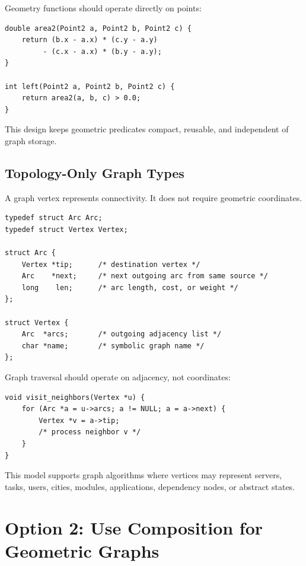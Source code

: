 \documentclass[11pt]{article}
\begin{document}
Geometry functions should operate directly on points:

\begin{verbatim}
double area2(Point2 a, Point2 b, Point2 c) {
    return (b.x - a.x) * (c.y - a.y)
         - (c.x - a.x) * (b.y - a.y);
}

int left(Point2 a, Point2 b, Point2 c) {
    return area2(a, b, c) > 0.0;
}
\end{verbatim}

This design keeps geometric predicates compact, reusable, and independent of graph storage.

\subsection{Topology-Only Graph Types}

A graph vertex represents connectivity. It does not require geometric coordinates.

\begin{verbatim}
typedef struct Arc Arc;
typedef struct Vertex Vertex;

struct Arc {
    Vertex *tip;      /* destination vertex */
    Arc    *next;     /* next outgoing arc from same source */
    long    len;      /* arc length, cost, or weight */
};

struct Vertex {
    Arc  *arcs;       /* outgoing adjacency list */
    char *name;       /* symbolic graph name */
};
\end{verbatim}

Graph traversal should operate on adjacency, not coordinates:

\begin{verbatim}
void visit_neighbors(Vertex *u) {
    for (Arc *a = u->arcs; a != NULL; a = a->next) {
        Vertex *v = a->tip;
        /* process neighbor v */
    }
}
\end{verbatim}

This model supports graph algorithms where vertices may represent servers, tasks, users, cities, modules, applications, dependency nodes, or abstract states.

\section{Option 2: Use Composition for Geometric Graphs}
\end{document}
